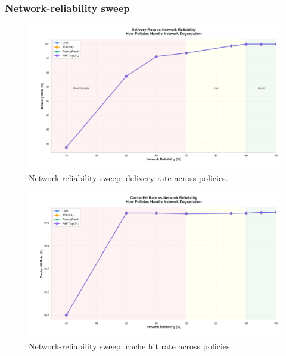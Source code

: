 \documentclass[11pt,twocolumn]{article}
\begin{document}
\subsubsection{Network-reliability sweep}
\begin{figure}[h]
    \centering
    \includegraphics[width=\linewidth]{figures/network_reliability_deliveryRate.png}
    \caption{Network-reliability sweep: delivery rate across policies.}
    \label{fig:network-delivery}
\end{figure}

\begin{figure}[h]
    \centering
    \includegraphics[width=\linewidth]{figures/network_reliability_cacheHitRate.png}
    \caption{Network-reliability sweep: cache hit rate across policies.}
    \label{fig:network-cachehit}
\end{figure}
\end{document}
